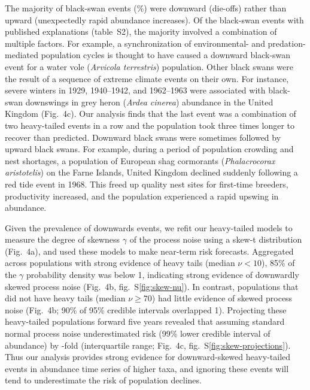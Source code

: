 The majority of black-swan events (\percBSDown \%) were downward (die-offs) rather than upward (unexpectedly rapid abundance increases). Of the black-swan events with published explanations (table~S2), the majority involved a combination of multiple factors. For example, a synchronization of environmental- and predation-mediated population cycles is thought to have caused a downward black-swan event for a water vole (\emph{Arvicola terrestris}) population\cite{saucy1994}. Other black swans were the result of a sequence of extreme climate events on their own. For instance, severe winters in 1929, 1940--1942, and 1962--1963 were associated with black-swan downswings in grey heron (\emph{Ardea cinerea}) abundance in the United Kingdom\cite{stafford1971} (Fig.~4c). Our analysis finds that the last event was a combination of two heavy-tailed events in a row and the population took three times longer to recover than predicted\cite{stafford1971}. Downward black swans were sometimes followed by upward black swans. For example, during a period of population crowding and nest shortages, a population of European shag cormorants (\emph{Phalacrocorax aristotelis}) on the Farne Islands, United Kingdom declined suddenly following a red tide event in 1968\cite{potts1980}. This freed up quality nest sites for first-time breeders, productivity increased, and the population experienced a rapid upswing in abundance\cite{potts1980}.

Given the prevalence of downwards events, we refit our heavy-tailed models to measure the degree of skewness \(\gamma\) of the process noise using a skew-t distribution (Fig.~4a), and used these models to make near-term risk forecasts. Aggregated across populations with strong evidence of heavy tails (median \(\nu < 10\)), 85\% of the \(\gamma\) probability density was below 1, indicating strong evidence of downwardly skewed process noise (Fig.~4b, fig.~S\ref{fig:skew-nu}). In contrast, populations that did not have heavy tails (median \(\nu \geq 70\)) had little evidence of skewed process noise (Fig.~4b; 90\% of 95\% credible intervals overlapped 1). Projecting these heavy-tailed populations forward five years revealed that assuming standard normal process noise underestimated risk (99\% lower credible interval of abundance) by \crashUnderRange-fold (interquartile range; Fig.~4c, fig.~S\ref{fig:skew-projections}). Thus our analysis provides strong evidence for downward-skewed heavy-tailed events in abundance time series of higher taxa, and ignoring these events will tend to underestimate the risk of population declines.

